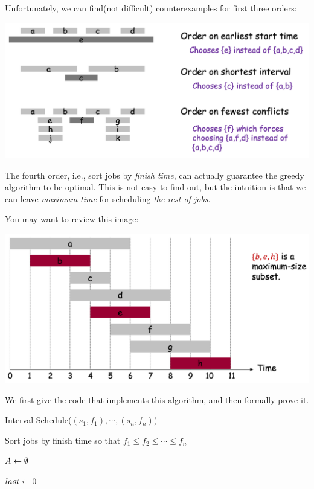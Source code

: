 \begin{spacing}{1.3}
    Unfortunately, we can find(not difficult) counterexamples for first three orders:
    \begin{center}
        \includegraphics[scale=0.35]{images/07-interval-countereg.png}
    \end{center}

    The fourth order, i.e., sort jobs by {\it finish time}, can actually guarantee the greedy 
    algorithm to be optimal. This is not easy to find out, but the intuition is that 
    we can leave {\it maximum time} for scheduling {\it the rest of jobs}.

    You may want to review this image:
    \begin{center}
        \includegraphics[scale=0.35]{images/07-interval-example.png}
    \end{center}
    We first give the code that implements this algorithm, and then formally prove it.
    
    \begin{algorithm*}
        \caption{Interval-Schedule($(s_1,f_1), \cdots, (s_n, f_n)$)}
        Sort jobs by finish time so that $f_1\le f_2\le \cdots \le f_n$

        $A\leftarrow \emptyset$ \qquad {}

        $last \leftarrow 0$   \qquad {}


\end{algorithm*}
\end{spacing}
